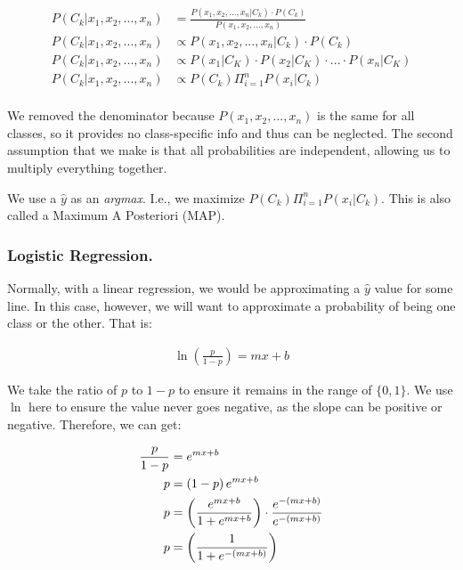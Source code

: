 \begin{equation}
\begin{split}
    P(C_k | x_1, x_2, ..., x_n) &= \frac{P(x_1, x_2, ..., x_n | C_k) \cdot P(C_k)}{P(x_1, x_2, ..., x_n)} \\
    P(C_k | x_1, x_2, ..., x_n) &\propto P(x_1, x_2, ..., x_n | C_k) \cdot P(C_k)\\
    P(C_k | x_1, x_2, ..., x_n) &\propto P(x_1 | C_K) \cdot P(x_2 | C_K) \cdot ... \cdot P(x_n | C_K) \\
    P(C_k | x_1, x_2, ..., x_n) &\propto P(C_k)\Pi^n_{i=1}P(x_i|C_k) \\
\end{split}
\end{equation}

We removed the denominator because $P(x_1, x_2, ..., x_n)$ is the same for all classes, so it provides no class-specific info and thus can be neglected. The second assumption that we make is that all probabilities are independent, allowing us to multiply everything together.\newline

We use a $\hat{y}$ as an \textit{argmax}. I.e., we maximize $P(C_k)\Pi^n_{i=1}P(x_i|C_k)$. This is also called a Maximum A Posteriori (MAP). 

\subsubsection{Logistic Regression.}

Normally, with a linear regression, we would be approximating a $\hat{y}$ value for some line. In this case, however, we will want to approximate a probability of being one class or the other. That is: 

\begin{equation}
\begin{split}
    \ln(\frac{p}{1-p}) = mx + b        
\end{split}
\end{equation}

We take the ratio of $p$ to $1-p$ to ensure it remains in the range of $\{0,1\}$. We use $\ln$ here to ensure the value never goes negative, as the slope can be positive or negative. Therefore, we can get: 

\begin{equation}
\begin{split}
    \frac{p}{1-p} &= e^{mx + b} \\
    p &= \left(1-p\right)e^{mx + b} \\
    p &= \left(\frac{e^{mx+b}}{1 + e^{mx+b}}\right) \cdot \frac{e^{-(mx+b)}}{e^{-(mx+b)}} \\
    p &= \left(\frac{1}{1 + e^{-(mx+b)}}\right) \\
\end{split}
\end{equation}

